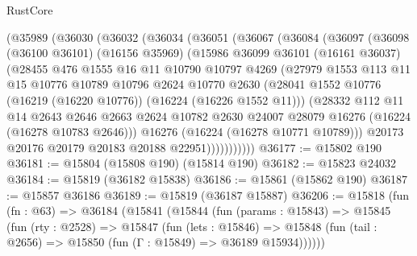 \begin{lexlean}{RustCore}
\begin{coremodule}
    (@35989
      (@36030
        (@36032
          (@36034
            (@36051
              (@36067
                (@36084
                  (@36097
                    (@36098
                      (@36100 @36101)
                      (@16156 @35969)
                      (@15986
                        @36099
                        @36101
                        (@16161 @36037)
                        (@28455
                          @476
                          @1555
                          @16
                          @11
                          @10790
                          @10797
                          @4269
                          (@27979
                            @1553
                            @113
                            @11
                            @15
                            @10776
                            @10789
                            @10796
                            @2624
                            @10770
                            @2630
                            (@28041
                              @1552
                              @10776
                              (@16219 (@16220 @10776))
                              (@16224 (@16226 @1552 @11)))
                            (@28332
                              @112
                              @11
                              @14
                              @2643
                              @2646
                              @2663
                              @2624
                              @10782
                              @2630
                              @24007
                              @28079
                              @16276
                              (@16224 (@16278 @10783 @2646)))
                            @16276
                            (@16224 (@16278 @10771 @10789)))
                          @20173
                          @20176
                          @20179
                          @20183
                          @20188
                          @22951)))))))))))
@36177 := @15802 @190
@36181 := @15804 (@15808 @190) (@15814 @190)
@36182 := @15823 @24032
@36184 := @15819 (@36182 @15838)
@36186 := @15861 (@15862 @190)
@36187 := @15857 @36186
@36189 := @15819 (@36187 @15887)
@36206 := @15818
    (fun (fn : @63) =>
    @36184
      (@15841
        (@15844
          (fun (params : @15843) =>
          @15845
            (fun (rty : @2528) =>
            @15847
              (fun (lets : @15846) =>
              @15848 (fun (tail : @2656) => @15850 (fun (Γ : @15849) => @36189 @15934))))))

\end{coremodule}
\end{lexlean}
